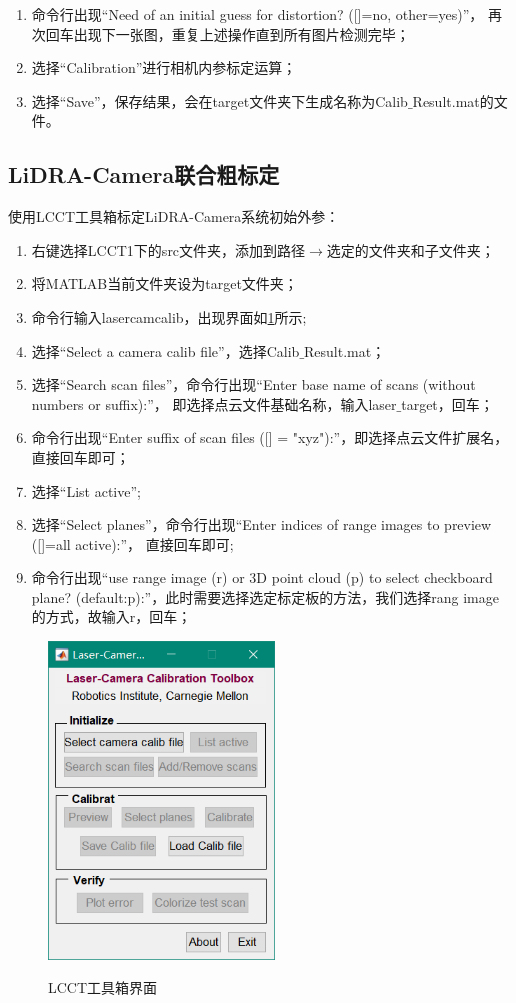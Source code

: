 \begin{enumerate}[$\star$]
\item 命令行出现“Need of an initial guess for distortion? ([]=no, other=yes)”，
再次回车出现下一张图，重复上述操作直到所有图片检测完毕；
\item 选择“Calibration”进行相机内参标定运算；
\item 选择“Save”，保存结果，会在target文件夹下生成名称为Calib$\_$Result.mat的文件。
\end{enumerate}

\subsection{LiDRA-Camera联合粗标定}
使用LCCT工具箱标定LiDRA-Camera系统初始外参：

\begin{enumerate}[$\star$]
\item 右键选择LCCT1下的src文件夹，添加到路径$\rightarrow$选定的文件夹和子文件夹；
\item 将MATLAB当前文件夹设为target文件夹；
\item 命令行输入lasercamcalib，出现界面如\figurename\ref{fig: pic9}所示;
\item 选择“Select a camera calib file”，选择Calib$\_$Result.mat；
\item 选择“Search scan files”，命令行出现“Enter base name of scans (without numbers or suffix):”，
即选择点云文件基础名称，输入laser$\_$target，回车；
\item 命令行出现“Enter suffix of scan files ([] = "xyz"):”，即选择点云文件扩展名，直接回车即可；
\item 选择“List active”;
\item 选择“Select planes”，命令行出现“Enter indices of range images to preview ([]=all active):”，
直接回车即可;
\item 命令行出现“use range image (r) or 3D point cloud (p) to select checkboard plane?
 (default:p):”，此时需要选择选定标定板的方法，我们选择rang image的方式，故输入r，回车；
\end{enumerate}

\begin{figure}[htbp]
    \centering
    \includegraphics[width=6cm]{pic/9.png} \\
    \caption{LCCT工具箱界面}\label{fig: pic9}
\end{figure}

